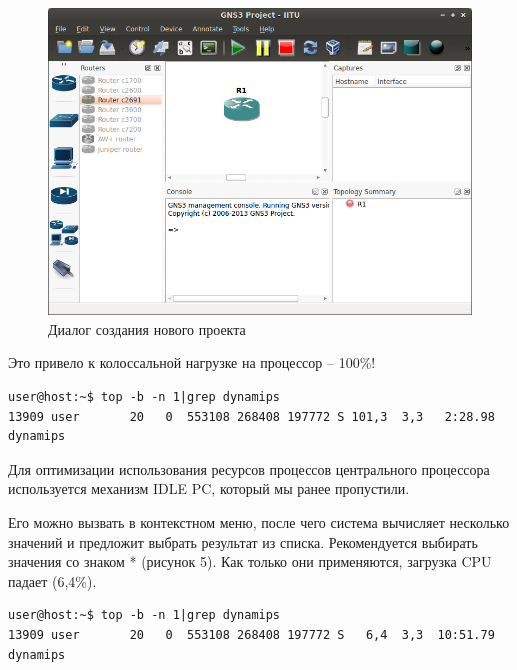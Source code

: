 \begin{figure}[h!]
\centering
\includegraphics[scale=0.63]{res/pic004}
\caption{Диалог создания нового проекта}
\end{figure}

Это привело к колоссальной нагрузке на процессор -- 100\%!

\begin{Verbatim}[frame=single]
user@host:~$ top -b -n 1|grep dynamips
13909 user       20   0  553108 268408 197772 S 101,3  3,3   2:28.98 dynamips
\end{Verbatim}

Для оптимизации использования ресурсов процессов центрального процессора используется механизм IDLE PC, который мы ранее пропустили.

Его можно вызвать в контекстном меню, после чего система вычисляет несколько значений и предложит выбрать результат из списка. Рекомендуется выбирать значения со знаком * (рисунок 5). Как только они применяются, загрузка CPU падает (6,4\%).

\begin{Verbatim}[frame=single]
user@host:~$ top -b -n 1|grep dynamips
13909 user       20   0  553108 268408 197772 S   6,4  3,3  10:51.79 dynamips
\end{Verbatim}


